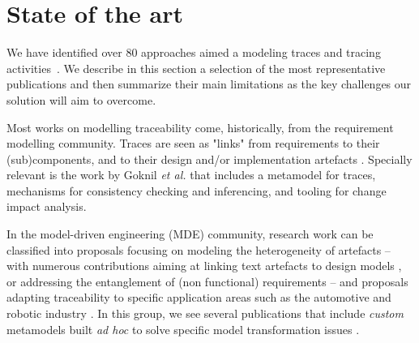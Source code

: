 	\vspace{-0.4truecm}
\section{State of the art}\label{sec:soa}
	\vspace{-0.2truecm}

We have identified over 80 approaches aimed a modeling traces and tracing activities~\cite{batot2020-survey-driven-feature-model}. We describe in this section a selection of the most representative publications and then summarize their main limitations as the key challenges our solution will aim to overcome. 


Most works on modelling traceability come, historically, from the requirement modelling community. Traces are seen as "links" from requirements to their (sub)components, and to their design and/or implementation artefacts \cite{taromirad2012-TIM-for-Agile-req,Haidrar_2018}. 
Specially relevant is the work by Goknil \textit{et al.} \cite{goknil2008-metamodel-for-reasoning} that includes a metamodel for traces, mechanisms for consistency checking and inferencing, and tooling for change impact analysis.

In the model-driven engineering (MDE) community, research work can be classified into proposals focusing on modeling the heterogeneity of artefacts -- with numerous contributions aiming at linking text artefacts to design models \cite{sannier2012-TIM-for-text-req-in-MDE}, or addressing the entanglement of (non functional) requirements \cite{yrjonen2010-TIM-for-NonFunc-in-MDE} -- and proposals adapting traceability to specific application areas such as the automotive and robotic industry  \cite{dubois2010-TIM-for-Req-in-MD-Automotive,Sanchez_2011,seibel2012-efficient-traceability-for-MDE}. In this group, we see several publications that include \textit{custom} metamodels built \textit{ad hoc} to solve specific model transformation issues \cite{levendovsky2010-TIM-for-MT,Jim_nez_2013}. %

